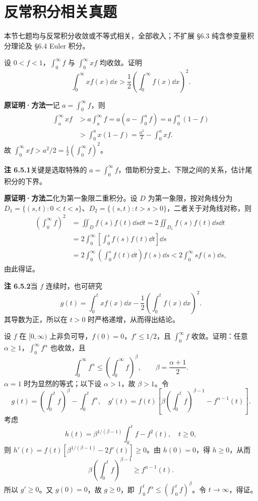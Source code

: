 \clearpage
\section{反常积分相关真题}
本节七题均与反常积分收敛或不等式相关，全部收入；不扩展 §6.3 纯含参变量积分理论及 §6.4 Euler 积分。

设 $0<f<1$，$\int_0^\infty f$ 与 $\int_0^\infty xf$ 均收敛。证明
\[
\int_0^\infty xf(x)\dd x>\frac12\left(\int_0^\infty f(x)\dd x\right)^2.
\]
\par\textbf{原证明·方法一}\quad 记 $a=\int_0^\infty f$，则
\begin{align*}
\int_a^\infty xf&>a\int_a^\infty f=a\left(a-\int_0^af\right)
=a\int_0^a(1-f)\\
&>\int_0^ax(1-f)=\frac{a^2}{2}-\int_0^axf.
\end{align*}
故 $\int_0^\infty xf>a^2/2=\frac12(\int_0^\infty f)^2$。

\textbf{注 6.5.1}\quad 关键是选取特殊的 $a=\int_0^\infty f$，借助积分变上、下限之间的关系，估计尾积分的下界。

\par\textbf{原证明·方法二}\quad 化为第一象限二重积分。设 $D$ 为第一象限，按对角线分为 $D_1=\{(s,t):0<t<s\}$、$D_2=\{(s,t):t>s>0\}$，二者关于对角线对称，则
\begin{align*}
\left(\int_0^\infty f\right)^2
&=\iint_Df(s)f(t)\dd s\dd t=2\iint_{D_1}f(s)f(t)\dd s\dd t\\
&=2\int_0^\infty\left[\int_0^sf(s)f(t)\dd t\right]\dd s\\
&=2\int_0^\infty\left(\int_0^sf(t)\dd t\right)f(s)\dd s
<2\int_0^\infty sf(s)\dd s,
\end{align*}
由此得证。

\textbf{注 6.5.2}\quad 当 $f$ 连续时，也可研究
\[
g(t)=\int_0^txf(x)\dd x-\frac12\left(\int_0^tf(x)\dd x\right)^2.
\]
其导数为正，所以在 $t>0$ 时严格递增，从而得出结论。

设 $f$ 在 $[0,\infty)$ 上非负可导，$f(0)=0$，$f'\le1/2$，且 $\int_0^\infty f$ 收敛。证明：任意 $\alpha\ge1$，$\int_0^\infty f^\alpha$ 也收敛，且
\[
\int_0^\infty f^\alpha\le\left(\int_0^\infty f\right)^\beta,
\qquad\beta=\frac{\alpha+1}{2}.
\]
\prooftext $\alpha=1$ 时为显然的等式；以下设 $\alpha>1$，故 $\beta>1$。令
\[
g(t)=\left(\int_0^tf\right)^\beta-\int_0^tf^\alpha,
\quad g'(t)=f(t)\left[\beta\left(\int_0^tf\right)^{\beta-1}-f^{\alpha-1}(t)\right].
\]
考虑
\[
h(t)=\beta^{1/(\beta-1)}\int_0^tf-f^2(t),\quad t\ge0,
\]
则 $h'(t)=f(t)[\beta^{1/(\beta-1)}-2f'(t)]\ge0$。由 $h(0)=0$，得 $h\ge0$，从而
\[
\beta\left(\int_0^tf\right)^{\beta-1}\ge f^{\alpha-1}(t).
\]
所以 $g'\ge0$。又 $g(0)=0$，故 $g\ge0$，即 $\int_0^tf^\alpha\le(\int_0^tf)^\beta$。令 $t\to\infty$，得证。

